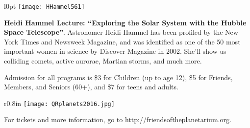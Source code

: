 \documentclass{article}
\begin{document}
 \begin{wrapfigure}[6]{l}{0pt}
   \texttt{[image: HHammel561]}
 \end{wrapfigure}      


   {\fontsize{19}{19}

   \textbf{Heidi Hammel Lecture: “Exploring the Solar System with the Hubble Space Telescope”}. 
Astronomer Heidi Hammel has been profiled by the New York Times and Newsweek Magazine, and was identified as one of the 50 most important women in science by Discover Magazine in 2002. She’ll show us colliding comets, active aurorae, Martian storms, and much more.

   }

   {\fontsize{16}{18}

Admission for all programs is \$3 for Children (up to age 12), \$5 for Friends, Members, and Seniors (60+), and \$7 for teens and adults.

   }



   {\fontsize{18}{24}

\begin{wrapfigure}{r}{0.8in}
   \texttt{[image: QRplanets2016.jpg]}
\end{wrapfigure}      

\begin{centering}
  
For tickets and more information, go to\break
http://friendsoftheplanetarium.org.

\end{centering}

}



\end{document}
